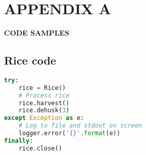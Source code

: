 \chapter*{APPENDIX A}
\begin{center}
    {\normalfont\Large\bfseries CODE SAMPLES}
\end{center}

\section*{Rice code}
\begin{singlespace}
\begin{lstlisting}[language=Python]
try:
    rice = Rice()
    # Process rice
    rice.harvest()
    rice.dehusk(3)
except Exception as e:
    # Log to file and stdout on screen
    logger.error('{}'.format(e))
finally:
    rice.close()
\end{lstlisting}
\end{singlespace}
